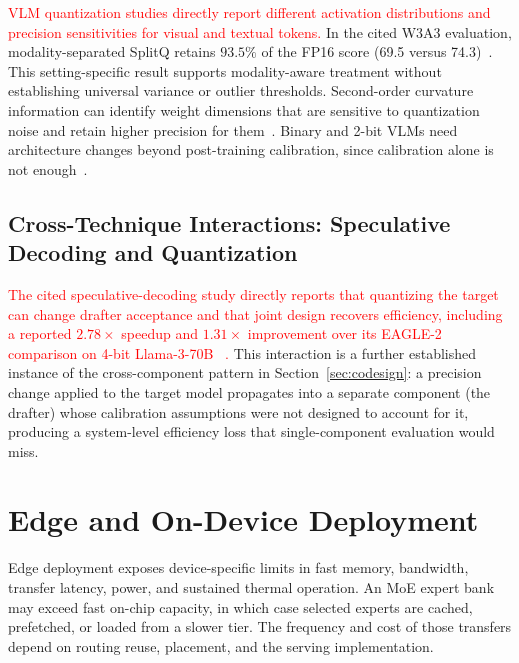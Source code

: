 \documentclass[10pt]{article}
\begin{document}
\textcolor{red}{VLM quantization studies directly report different activation
distributions and precision sensitivities for visual and textual tokens.}  In the cited
W3A3 evaluation, modality-separated SplitQ retains $93.5\%$ of the FP16 score (69.5
versus 74.3)~\citep{zhong2026breakingmodalityheterogeneitylowbit}.  This setting-specific
result supports modality-aware treatment without establishing universal variance or
outlier thresholds.  Second-order curvature information can identify weight
dimensions that are sensitive to quantization noise and retain higher precision for
them~\citep{xue2026vlmqtokensaliencydrivenposttraining}.  Binary and 2-bit VLMs
need architecture changes beyond post-training calibration, since
calibration alone is not enough~\citep{wang2025bivlmpushingultralowprecision,guo2025speedqstagedprocessingenhanced}.

\subsection{Cross-Technique Interactions: Speculative Decoding and Quantization}

\textcolor{red}{The cited speculative-decoding study directly reports that quantizing
the target can change drafter acceptance and that joint design recovers efficiency,
including a reported $2.78\!\times$ speedup and $1.31\!\times$ improvement over its
EAGLE-2 comparison on 4-bit Llama-3-70B
~\citep{zhang2025speculativedecodingmeetsquantization}.}  This
interaction is a further established instance of the cross-component pattern in
Section~\ref{sec:codesign}:
a precision change applied to the target model propagates into a separate component
(the drafter) whose calibration assumptions were not designed to account for it,
producing a system-level efficiency loss that single-component evaluation would miss.

\section{Edge and On-Device Deployment}
\label{sec:edge}

Edge deployment exposes device-specific limits in fast memory, bandwidth, transfer
latency, power, and sustained thermal operation.  An MoE expert bank may exceed fast
on-chip capacity, in which case selected experts are cached, prefetched, or loaded from
a slower tier.  The frequency and cost of those transfers depend on routing reuse,
placement, and the serving implementation.
\end{document}

